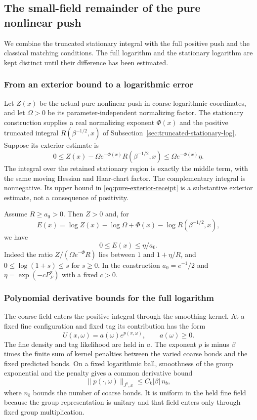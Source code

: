 \subsection{The small-field remainder of the pure nonlinear push}
\label{sec:pure-action-small-field}
We combine the truncated stationary integral with the full positive
push and the classical matching conditions. The full logarithm and
the stationary logarithm are kept distinct until their difference
has been estimated.

\subsubsection{From an exterior bound to a logarithmic error}
Let $Z(x)$ be the actual pure nonlinear push in coarse logarithmic
coordinates, and let $\Omega>0$ be its parameter-independent
normalizing factor. The stationary construction supplies a real
normalizing exponent $\Phi(x)$ and the positive truncated integral
$R(\beta^{-1/2},x)$ of
Subsection~\ref{sec:truncated-stationary-log}. Suppose its exterior
estimate is
\begin{equation}\label{eq:pure-exterior-receipt}
 0\le Z(x)-\Omega e^{-\Phi(x)}R(\beta^{-1/2},x)
                          \le\Omega e^{-\Phi(x)}\eta.
\end{equation}
The integral over the retained stationary region is exactly the
middle term, with the same moving Hessian and Haar-chart factor.
The complementary integral is nonnegative. Its upper bound in
\eqref{eq:pure-exterior-receipt} is a substantive exterior estimate,
not a consequence of positivity.

Assume $R\ge a_0>0$. Then $Z>0$ and, for
\[
 E(x)=\log Z(x)-\log\Omega+\Phi(x)
                              -\log R(\beta^{-1/2},x),
\]
we have
\begin{equation}\label{eq:pure-log-value}
                             0\le E(x)\le\eta/a_0.
\end{equation}
Indeed the ratio $Z/(\Omega e^{-\Phi}R)$ lies between $1$ and
$1+\eta/R$, and $0\le\log(1+s)\le s$ for $s\ge0$.
In the construction $a_0=e^{-1}/2$ and
$\eta=\exp(-cP_F^2)$ with a fixed $c>0$.

\subsubsection{Polynomial derivative bounds for the full logarithm}
The coarse field enters the positive integral through the smoothing
kernel. At a fixed fine configuration and fixed tag its contribution
has the form
\[
                 U(x,\omega)=a(\omega)e^{p(x,\omega)},
                       \qquad a(\omega)\ge0.
\]
The fine density and tag likelihood are held in $a$. The exponent
$p$ is minus $\beta$ times the finite sum of kernel penalties
between the varied coarse bonds and the fixed predicted bonds.
On a fixed logarithmic ball, smoothness of the group exponential
and the penalty gives a common derivative bound
\[
              \|p(\cdot,\omega)\|_{J^k,x}
                              \le C_k|\beta|\,n_b,
\]
where $n_b$ bounds the number of coarse bonds. It is uniform in the
held fine field because the group representation is unitary and
that field enters only through fixed group multiplication.

